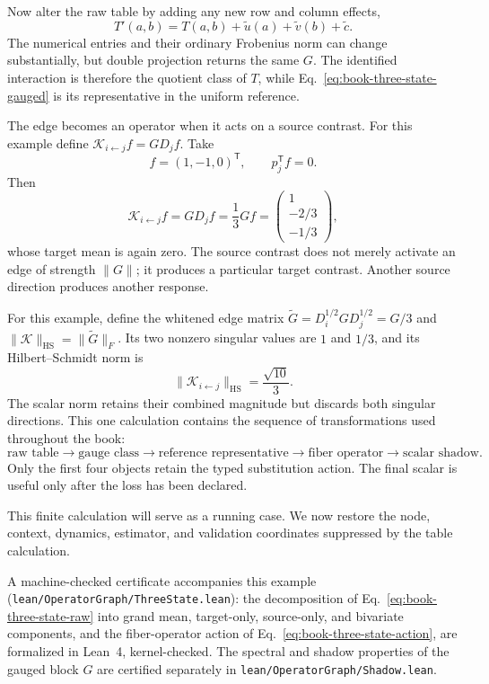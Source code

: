 Now alter the raw table by adding any new row and column effects,
\begin{equation}
T'(a,b)=T(a,b)+\widetilde u(a)+\widetilde v(b)+\widetilde c.
\end{equation}
The numerical entries and their ordinary Frobenius norm can change substantially, but double
projection returns the same $G$.  The identified interaction is therefore the quotient class of
$T$, while Eq.~\ref{eq:book-three-state-gauged} is its representative in the uniform reference.

The edge becomes an operator when it acts on a source contrast.  For this example define
$\mathcal K_{i\leftarrow j}f=GD_jf$.  Take
\begin{equation}
f=(1,-1,0)^{\mathsf T},
\qquad p_j^{\mathsf T}f=0.
\end{equation}
Then
\begin{equation}
\mathcal K_{i\leftarrow j}f
=GD_jf
=\frac13Gf
=
\begin{pmatrix}
1\\[-2pt]
-2/3\\[-2pt]
-1/3
\end{pmatrix},
\label{eq:book-three-state-action}
\end{equation}
whose target mean is again zero.  The source contrast does not merely activate an edge of strength
$\|G\|$; it produces a particular target contrast.  Another source direction produces another
response.

For this example, define the whitened edge matrix
$\widetilde G=D_i^{1/2}GD_j^{1/2}=G/3$ and
$\|\mathcal K\|_{\mathrm{HS}}=\|\widetilde G\|_F$.  Its two nonzero singular values are $1$ and
$1/3$, and its Hilbert--Schmidt norm is
\begin{equation}
\|\mathcal K_{i\leftarrow j}\|_{\mathrm{HS}}
=\frac{\sqrt{10}}{3}.
\end{equation}
The scalar norm retains their combined magnitude but discards both singular directions.  This one
calculation contains the sequence of transformations used throughout the book:
\begin{equation}
\boxed{
\text{raw table}
\longrightarrow
\text{gauge class}
\longrightarrow
\text{reference representative}
\longrightarrow
\text{fiber operator}
\longrightarrow
\text{scalar shadow}.}
\label{eq:book-table-to-shadow}
\end{equation}
Only the first four objects retain the typed substitution action.  The final scalar is useful only
after the loss has been declared.

This finite calculation will serve as a running case.  We now restore the node, context, dynamics,
estimator, and validation coordinates suppressed by the table calculation.

A machine-checked certificate accompanies this example
(\texttt{lean/OperatorGraph/ThreeState.lean}): the decomposition of
Eq.~\ref{eq:book-three-state-raw} into grand mean, target-only, source-only,
and bivariate components, and the fiber-operator action of
Eq.~\ref{eq:book-three-state-action}, are formalized in Lean~4,
kernel-checked.  The spectral and shadow properties of the gauged block $G$
are certified separately in \texttt{lean/OperatorGraph/Shadow.lean}.
